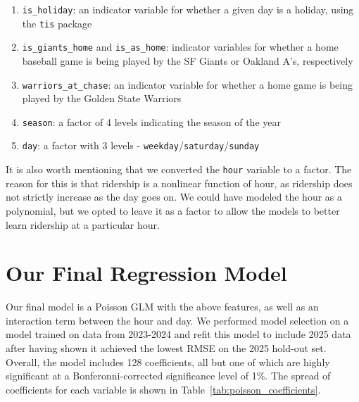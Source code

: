 \documentclass[11pt, letterpaper]{article}
\begin{document}
\begin{enumerate}
    \item \texttt{is\_holiday}: an indicator variable for whether a given day is a holiday, using the \texttt{tis} package
    \item \texttt{is\_giants\_home} and \texttt{is\_as\_home}: indicator variables for whether a home baseball game is being played by the SF Giants or Oakland A's, respectively
    \item \texttt{warriors\_at\_chase}: an indicator variable for whether a home game is being played by the Golden State Warriors
    \item \texttt{season}: a factor of 4 levels indicating the season of the year
    \item \texttt{day}: a factor with 3 levels - \texttt{weekday}/\texttt{saturday}/\texttt{sunday}
\end{enumerate}

It is also worth mentioning that we converted the \texttt{hour} variable to a factor. The reason for this is that ridership is a nonlinear function of hour, as ridership does not strictly increase as the day goes on. We could have modeled the hour as a polynomial, but we opted to leave it as a factor to allow the models to better learn ridership at a particular hour.


\section{Our Final Regression Model}
\label{sec:model}

Our final model is a Poisson GLM with the above features, as well as an interaction term between the hour and day. We performed model selection on a model trained on data from 2023-2024 and refit this model to include 2025 data after having shown it achieved the lowest RMSE on the 2025 hold-out set. Overall, the model includes 128 coefficients, all but one of which are highly significant at a Bonferonni-corrected significance level of 1\%. The spread of coefficients for each variable is shown in Table~\ref{tab:poisson_coefficients}.
\end{document}
